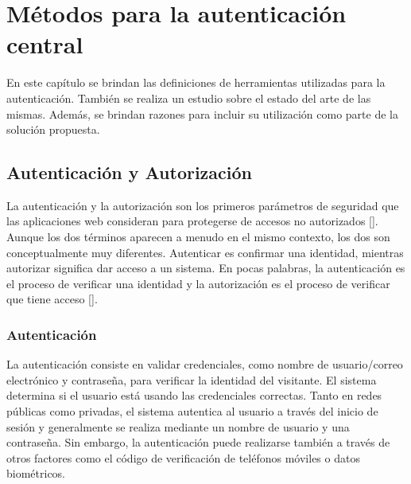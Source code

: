 
\chapter{Métodos para la autenticación central}\label{chapter:state-of-the-art}
En este capítulo se brindan las definiciones de herramientas utilizadas para la autenticación. También se realiza un estudio sobre el estado del arte de las mismas. Además, se brindan razones para incluir su utilización como parte de la solución propuesta.

\section*{Autenticación y Autorización}
La autenticación y la autorización son los primeros parámetros de seguridad que las aplicaciones web consideran para protegerse de accesos no autorizados [\cite{deitel2014como}].  Aunque los dos términos aparecen a menudo en el mismo contexto, los dos son conceptualmente muy diferentes. Autenticar es confirmar una identidad, mientras autorizar significa dar acceso a un sistema. En pocas palabras, la autenticación es el proceso de verificar una identidad y la autorización es el proceso de verificar que tiene acceso [\cite{ye2022diseno}].

\subsection*{Autenticación}
La autenticación consiste en validar credenciales, como nombre de usuario/correo electrónico y contraseña, para verificar la identidad del visitante. El sistema determina si el usuario está usando las credenciales correctas. Tanto en redes públicas como privadas, el sistema autentica al usuario a través del inicio de sesión y generalmente se realiza mediante un nombre de usuario y
una contraseña. Sin embargo, la autenticación puede realizarse  también a través de otros factores como el código de verificación de teléfonos móviles o datos biométricos.

